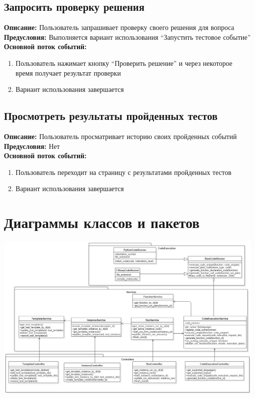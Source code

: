 \documentclass{article}
\begin{document}
    \subsection{Запросить проверку решения}
    \textbf{Описание:} Пользователь запрашивает проверку своего решения для вопроса\\
    \textbf{Предусловия:} Выполняется вариант использования “Запустить тестовое событие”\\
    \textbf{Основной поток событий:}
    \begin{enumerate}
        \item Пользователь нажимает кнопку “Проверить решение” и через некоторое время получает результат проверки
        \item Вариант использования завершается
    \end{enumerate}

    \subsection{Просмотреть результаты пройденных тестов}
    \textbf{Описание:} Пользователь просматривает историю своих пройденных событий\\
    \textbf{Предусловия:} Нет\\
    \textbf{Основной поток событий:}
    \begin{enumerate}
        \item Пользователь переходит на страницу с результатами пройденных тестов
        \item Вариант использования завершается
    \end{enumerate}

    \section{Диаграммы классов и пакетов}
    \includegraphics[width=\textwidth, keepaspectratio, angle=270,center]
    {ClassDiagram_Services}
    \pagebreak
\end{document}
